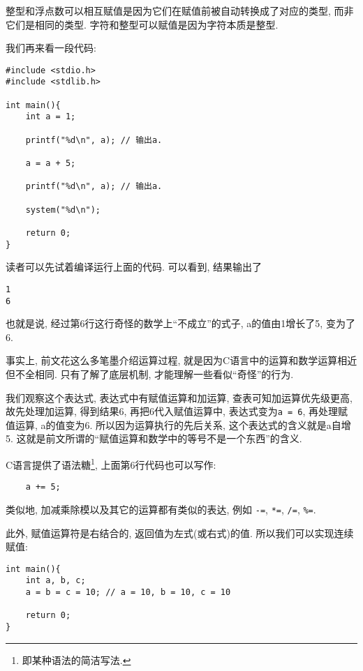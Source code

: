         整型和浮点数可以相互赋值是因为它们在赋值前被自动转换成了对应的类型, 而非它们是相同的类型. 字符和整型可以赋值是因为字符本质是整型.

        我们再来看一段代码:
\begin{lstlisting}
#include <stdio.h>
#include <stdlib.h>

int main(){
    int a = 1;

    printf("%d\n", a); // 输出a.

    a = a + 5;

    printf("%d\n", a); // 输出a.

    system("%d\n");

    return 0;
}
\end{lstlisting}

        读者可以先试着编译运行上面的代码. 可以看到, 结果输出了
\begin{lstlisting}
1
6
\end{lstlisting}

        也就是说, 经过第6行这行奇怪的数学上``不成立''的式子, a的值由1增长了5, 变为了6. 
        
        事实上, 前文花这么多笔墨介绍运算过程, 就是因为C语言中的运算和数学运算相近但不全相同. 只有了解了底层机制, 才能理解一些看似``奇怪''的行为.

        我们观察这个表达式, 表达式中有赋值运算和加运算, 查表可知加运算优先级更高, 故先处理加运算, 得到结果6, 再把6代入赋值运算中, 表达式变为\texttt{a = 6}, 再处理赋值运算, a的值变为6. 所以因为运算执行的先后关系, 这个表达式的含义就是a自增5. 这就是前文所谓的``赋值运算和数学中的等号不是一个东西''的含义.

        C语言提供了语法糖\footnote{即某种语法的简洁写法.}, 上面第6行代码也可以写作:
\begin{lstlisting}
    a += 5;
\end{lstlisting}

        类似地, 加减乘除模以及其它的运算都有类似的表达, 例如 \texttt{-=}, \texttt{*=}, \texttt{/=}, \texttt{\%=}.

        此外, 赋值运算符是右结合的, 返回值为左式(或右式)的值. 所以我们可以实现连续赋值:
\begin{lstlisting}
int main(){
    int a, b, c;
    a = b = c = 10; // a = 10, b = 10, c = 10

    return 0;
}
\end{lstlisting}

